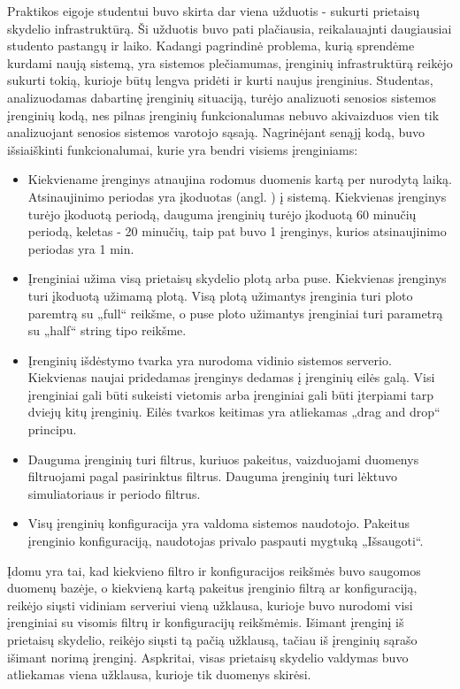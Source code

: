 \documentclass{VUMIFPSbakalaurinis}
\begin{document}
Praktikos eigoje studentui buvo skirta dar viena užduotis - sukurti prietaisų skydelio infrastruktūrą. Ši užduotis buvo pati plačiausia, reikalauajnti daugiausiai studento pastangų ir laiko. Kadangi pagrindinė problema, kurią sprendėme kurdami naują sistemą, yra sistemos plečiamumas, įrenginių infrastruktūrą reikėjo sukurti tokią, kurioje būtų lengva pridėti ir kurti naujus įrenginius. Studentas, analizuodamas dabartinę įrenginių situaciją, turėjo analizuoti senosios sistemos įrenginių kodą, nes pilnas įrenginių funkcionalumas nebuvo akivaizduos vien tik analizuojant senosios sistemos varotojo sąsają. Nagrinėjant senąjį kodą, buvo išsiaiškinti funkcionalumai, kurie yra bendri visiems įrenginiams:
\begin{itemize}
    \item Kiekviename įrenginys atnaujina rodomus duomenis kartą per nurodytą laiką. Atsinaujinimo periodas yra įkoduotas (angl. ) į sistemą. Kiekvienas įrenginys turėjo įkoduotą periodą, dauguma įrenginių turėjo įkoduotą 60 minučių periodą, keletas - 20 minučių, taip pat buvo 1 įrenginys, kurios atsinaujinimo periodas yra 1 min.
    \item Įrenginiai užima visą prietaisų skydelio plotą arba puse. Kiekvienas įrenginys turi įkoduotą užimamą plotą. Visą plotą užimantys įrenginia turi ploto paremtrą su „full“ reikšme, o puse ploto užimantys įrenginiai turi parametrą su „half“ string tipo reikšme.
    \item Įrenginių išdėstymo tvarka yra nurodoma vidinio sistemos serverio. Kiekvienas naujai pridedamas įrenginys dedamas į įrenginių eilės galą. Visi įrenginiai gali būti sukeisti vietomis arba įrenginiai gali būti įterpiami tarp dviejų kitų įrenginių. Eilės tvarkos keitimas yra atliekamas „drag and drop“ principu.
    \item Dauguma įrenginių turi filtrus, kuriuos pakeitus, vaizduojami duomenys filtruojami pagal pasirinktus filtrus. Dauguma įrenginių turi lėktuvo simuliatoriaus ir periodo filtrus.
    \item Visų įrenginių konfiguracija yra valdoma sistemos naudotojo. Pakeitus įrenginio konfiguraciją, naudotojas privalo paspauti mygtuką „Išsaugoti“. 
\end{itemize}

Įdomu yra tai, kad kiekvieno filtro ir konfiguracijos reikšmės buvo saugomos duomenų bazėje, o kiekvieną kartą pakeitus įrenginio filtrą ar konfiguraciją, reikėjo siųsti vidiniam serveriui vieną užklausa, kurioje buvo nurodomi visi įrenginiai su visomis filtrų ir konfiguracijų reikšmėmis. Išimant įrenginį iš prietaisų skydelio, reikėjo siųsti tą pačią užklausą, tačiau iš įrenginių sąrašo išimant norimą įrenginį. Aspkritai, visas prietaisų skydelio valdymas buvo atliekamas viena užklausa, kurioje tik duomenys skirėsi.
\end{document}
